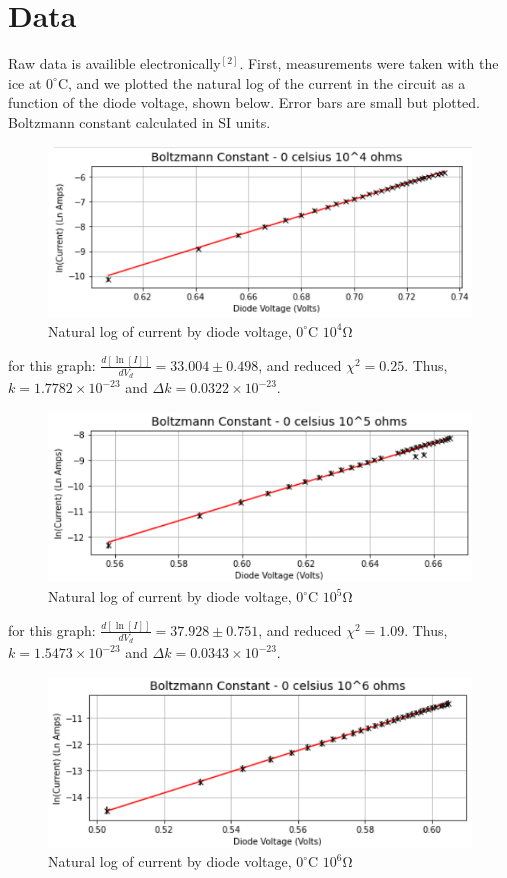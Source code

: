 \documentclass[12pt, a4paper]{article}
\begin{document}
\section{Data}
	Raw data is availible electronically$^{[2]}$. First, measurements were taken with the ice at $0^{\circ}$C, and we plotted the natural log of the current in the circuit as a function of the diode voltage, shown below. Error bars are small but plotted. Boltzmann constant calculated in SI units.
	\begin{figure}[H] \centering
		\includegraphics[scale=0.7]{assets/bcgraph_0c4o.png}
		\caption{Natural log of current by diode voltage, $0^{\circ}$C $10^4$\si{\ohm}}
	\end{figure}
	for this graph: $\frac{d[\ln [I]]}{dV_d} = 33.004 \pm 0.498$, and reduced $\chi^2 = 0.25$. Thus, $k = 1.7782 \times 10^{-23}$ and $\Delta k = 0.0322 \times 10^{-23}$.
	\begin{figure}[H] \centering
		\includegraphics[scale=0.7]{assets/bcgraph_0c5o.png}
		\caption{Natural log of current by diode voltage, $0^{\circ}$C $10^5$\si{\ohm}}
	\end{figure}
	for this graph: $\frac{d[\ln [I]]}{dV_d} = 37.928 \pm 0.751$, and reduced $\chi^2 = 1.09$. Thus, $k = 1.5473 \times 10^{-23}$ and $\Delta k = 0.0343 \times 10^{-23}$.
	\begin{figure}[H] \centering
		\includegraphics[scale=0.7]{assets/bcgraph_0c6o.png}
		\caption{Natural log of current by diode voltage, $0^{\circ}$C $10^6$\si{\ohm}}
	\end{figure}
\end{document}
